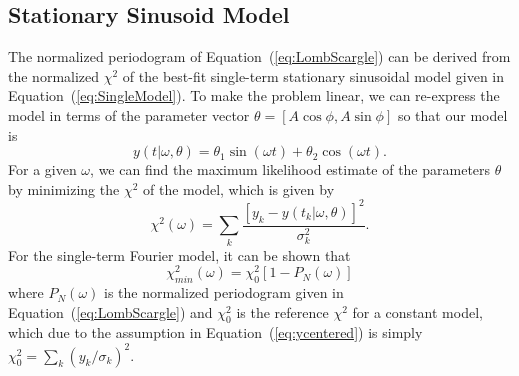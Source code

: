\documentclass[12pt,preprint]{aastex}
\newcommand{\Eq}[1]{Equation~(\ref{eq:#1})}
\newcommand{\eq}[1]{\Eq{#1}}
\newcommand{\eqlabel}[1]{\label{eq:#1}}
\begin{document}
\subsection{Stationary Sinusoid Model}

The normalized periodogram of \eq{LombScargle} can be derived from the normalized $\chi^2$ of the best-fit single-term stationary sinusoidal model given in \eq{SingleModel}. To make the problem linear, we can re-express the model in terms of the parameter vector $\theta = [A\cos\phi, A\sin\phi]$ so that our model is
\begin{equation}
  \eqlabel{simplemodel}
  y(t|\omega,\theta) = \theta_1\sin(\omega t) + \theta_2\cos(\omega t).
\end{equation}
For a given $\omega$, we can find the maximum likelihood estimate of the parameters $\theta$ by minimizing the $\chi^2$ of the model, which is given by
\begin{equation}
  \chi^2(\omega) = \sum_k \frac{[y_k - y(t_k|\omega,\theta)]^2}{\sigma_k^2}.
\end{equation}
For the single-term Fourier model, it can be shown \citep[See, e.g.][]{ICVG2014} that
\begin{equation}
  \eqlabel{chi2PN}
  \chi_{min}^2(\omega) = \chi^2_0[1 - P_N(\omega)]
\end{equation}
where $P_N(\omega)$ is the normalized periodogram given in \eq{LombScargle} and $\chi^2_0$ is the reference $\chi^2$ for a constant model, which due to the assumption in \eq{ycentered} is simply $\chi^2_0 = \sum_k (y_k/\sigma_k)^2$.
\end{document}
